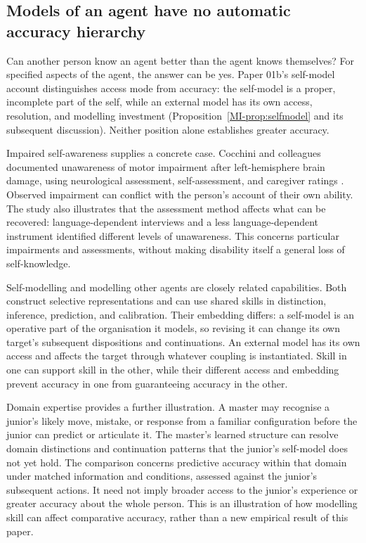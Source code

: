 \documentclass[11pt,a4paper]{article}
\theoremstyle{remark}
\begin{document}
\subsection{Models of an agent have no automatic accuracy hierarchy}

Can another person know an agent better than the agent knows themselves? For
specified aspects of the agent, the answer can be yes. Paper 01b's self-model
account distinguishes access mode from accuracy: the self-model is a proper,
incomplete part of the self, while an external model has its own access,
resolution, and modelling investment (Proposition~\ref{MI-prop:selfmodel} and
its subsequent discussion). Neither position alone establishes greater accuracy.

Impaired self-awareness supplies a concrete case. Cocchini and colleagues
documented unawareness of motor impairment after left-hemisphere brain damage,
using neurological assessment, self-assessment, and caregiver ratings
\citep{cocchini2009anosognosia}. Observed impairment can conflict with the
person's account of their own ability. The study also illustrates that the
assessment method affects what can be recovered: language-dependent interviews
and a less language-dependent instrument identified different levels of
unawareness. This concerns particular impairments and assessments, without
making disability itself a general loss of self-knowledge.

Self-modelling and modelling other agents are closely related capabilities.
Both construct selective representations and can use shared skills in
distinction, inference, prediction, and calibration. Their embedding differs:
a self-model is an operative part of the organisation it models, so revising it
can change its own target's subsequent dispositions and continuations. An
external model has its own access and affects the target through whatever
coupling is instantiated. Skill in one can support skill in the other, while
their different access and embedding prevent accuracy in one from guaranteeing
accuracy in the other.

Domain expertise provides a further illustration. A master may recognise a
junior's likely move, mistake, or response from a familiar configuration before
the junior can predict or articulate it. The master's learned structure can
resolve domain distinctions and continuation patterns that the junior's
self-model does not yet hold. The comparison concerns predictive accuracy
within that domain under matched information and conditions, assessed against
the junior's subsequent actions. It need not imply broader access to the
junior's experience or greater accuracy about the whole person. This is an
illustration of how modelling skill can affect comparative accuracy, rather
than a new empirical result of this paper.
\end{document}
